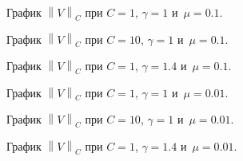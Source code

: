 \begin{figure}[H]
\caption{График $\left\| V \right\|_C$ при $C = 1$, $\gamma = 1$ и~$\mu = 0.1$.}
\end{figure}

\begin{figure}[H]
\caption{График $\left\| V \right\|_C$ при $C = 10$, $\gamma = 1$ и~$\mu = 0.1$.}
\end{figure}

\begin{figure}[H]
\caption{График $\left\| V \right\|_C$ при $C = 1$, $\gamma = 1.4$ и~$\mu = 0.1$.}
\end{figure}

\begin{figure}[H]
\caption{График $\left\| V \right\|_C$ при $C = 1$, $\gamma = 1$ и~$\mu = 0.01$.}
\end{figure}

\begin{figure}[H]
\caption{График $\left\| V \right\|_C$ при $C = 10$, $\gamma = 1$ и~$\mu = 0.01$.}
\end{figure}

\begin{figure}[H]
\caption{График $\left\| V \right\|_C$ при $C = 1$, $\gamma = 1.4$ и~$\mu = 0.01$.}
\end{figure}
